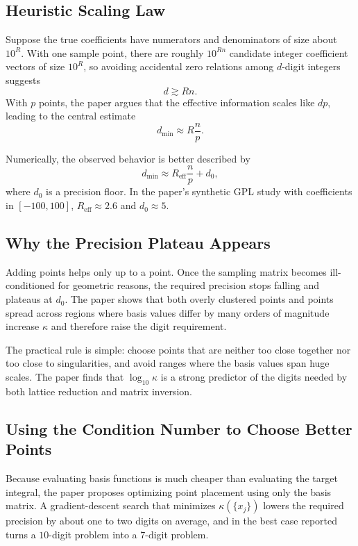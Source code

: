 \documentclass[11pt]{article}
\newcommand{\dmin}{d_{\min}}
\newcommand{\Reff}{R_{\mathrm{eff}}}
\begin{document}
\subsection{Heuristic Scaling Law}
Suppose the true coefficients have numerators and denominators of size about $10^R$. With one sample point, there are roughly $10^{Rn}$ candidate integer coefficient vectors of size $10^R$, so avoiding accidental zero relations among $d$-digit integers suggests
\[
d\gtrsim Rn.
\]
With $p$ points, the paper argues that the effective information scales like $dp$, leading to the central estimate
\begin{equation}
\dmin \approx R\frac{n}{p}.
\label{eq:dmin-theory}
\end{equation}

Numerically, the observed behavior is better described by
\begin{equation}
\dmin \approx \Reff\frac{n}{p}+d_0,
\label{eq:dmin-empirical}
\end{equation}
where $d_0$ is a precision floor. In the paper's synthetic GPL study with coefficients in $[-100,100]$, $\Reff\approx 2.6$ and $d_0\approx 5$.

\subsection{Why the Precision Plateau Appears}
Adding points helps only up to a point. Once the sampling matrix becomes ill-conditioned for geometric reasons, the required precision stops falling and plateaus at $d_0$. The paper shows that both overly clustered points and points spread across regions where basis values differ by many orders of magnitude increase $\kappa$ and therefore raise the digit requirement.

The practical rule is simple: choose points that are neither too close together nor too close to singularities, and avoid ranges where the basis values span huge scales. The paper finds that $\log_{10}\kappa$ is a strong predictor of the digits needed by both lattice reduction and matrix inversion.

\subsection{Using the Condition Number to Choose Better Points}
Because evaluating basis functions is much cheaper than evaluating the target integral, the paper proposes optimizing point placement using only the basis matrix. A gradient-descent search that minimizes $\kappa(\{x_j\})$ lowers the required precision by about one to two digits on average, and in the best case reported turns a $10$-digit problem into a $7$-digit problem.
\end{document}
